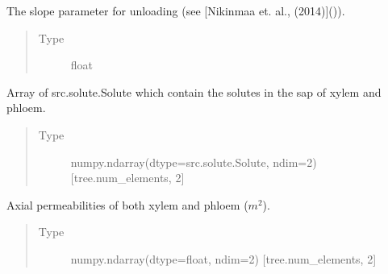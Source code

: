 \documentclass[letterpaper,10pt,english]{sphinxmanual}
\begin{document}
\begin{fulllineitems}
\begin{fulllineitems}
\begin{quote}
\begin{description}
\end{description}\end{quote}

\end{fulllineitems}


\begin{fulllineitems}
\label{\detokenize{index:src.tree.Tree.sugar_unloading_slope}}
The slope parameter for unloading (see
{[}Nikinmaa et. al., (2014){]}()).
\begin{quote}\begin{description}
\item[{Type}] \leavevmode
float

\end{description}\end{quote}

\end{fulllineitems}


\begin{fulllineitems}
\label{\detokenize{index:src.tree.Tree.solutes}}
Array of
src.solute.Solute which contain the solutes in the sap of xylem and phloem.
\begin{quote}\begin{description}
\item[{Type}] \leavevmode
numpy.ndarray(dtype=src.solute.Solute, ndim=2) {[}tree.num\_elements, 2{]}

\end{description}\end{quote}

\end{fulllineitems}


\begin{fulllineitems}
\label{\detokenize{index:src.tree.Tree.axial_permeability}}
Axial permeabilities of both
xylem and phloem (\(m^2\)).
\begin{quote}\begin{description}
\item[{Type}] \leavevmode
numpy.ndarray(dtype=float, ndim=2) {[}tree.num\_elements, 2{]}


\end{description}
\end{quote}
\end{fulllineitems}
\end{fulllineitems}
\end{document}
